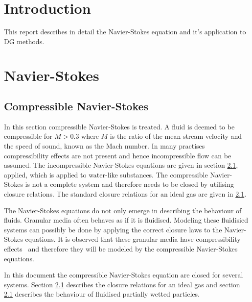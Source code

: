 \documentclass{report}
\begin{document}
\chapter{Introduction}

This report describes in detail the Navier-Stokes equation and it's application to DG methods.


\chapter{Navier-Stokes}
\section{Compressible Navier-Stokes}
In this section compressible Navier-Stokes is treated. A fluid is deemed to be compressible for $M > 0.3$ where $M$ is the ratio of the mean stream velocity and the speed of sound, known as the Mach number. In many practises compressibility effects are not present and hence incompressible flow can be assumed. The incompressible Navier-Stokes equations are given in section \ref{}, applied, which is applied to water-like substances. The compressible Navier-Stokes is not a complete system and therefore needs to be closed by utilising closure relations. The standard closure relations for an ideal gas are given in \ref{}.

The Navier-Stokes equations do not only emerge in describing the behaviour of fluids. Granular media often behaves as if it is fluidised. Modeling these fluidisied systems can possibly be done by applying the correct closure laws to the Navier-Stokes equations. It is observed that these granular media have compressibility effects~\cite{} and therefore they will be modeled by the compressible Navier-Stokes equations.

In this document the compressible Navier-Stokes equation are closed for several systems. Section \ref{} describes the closure relations for an ideal gas and section \ref{} describes the behaviour of fluidised partially wetted particles.
\end{document}
